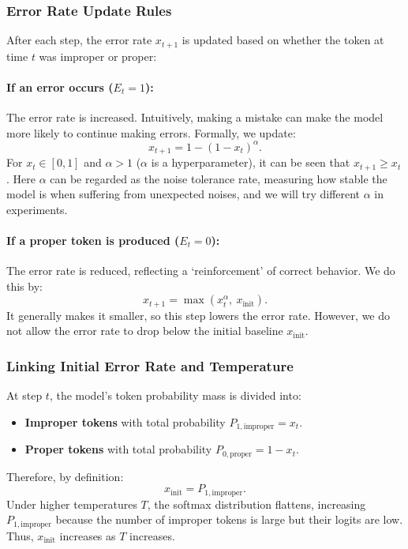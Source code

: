 \subsubsection{Error Rate Update Rules}
   After each step, the error rate \(x_{t+1}\) is updated based on whether the token at time \(t\) was improper or proper:

   \paragraph{If an error occurs (\(E_t = 1\)):}
   The error rate is increased. Intuitively, making a mistake can make the model more likely to continue making errors. Formally, we update:
   \[
   x_{t+1} = 1 - (1 - x_t)^\alpha.
   \]
   For \(x_t \in [0,1]\) and $\alpha > 1$ ($\alpha$ is a hyperparameter), it can be seen that \(x_{t+1} \ge x_t\). Here $\alpha$ can be regarded as the noise tolerance rate, measuring how stable the model is when suffering from unexpected noises, and we will try different $\alpha$ in experiments.

   \paragraph{If a proper token is produced (\(E_t = 0\)):}
   The error rate is reduced, reflecting a `reinforcement' of correct behavior. We do this by:
   \[
   x_{t+1} = \max(x_t^\alpha,\ x_{\text{init}}).
   \]
   It generally makes it smaller, so this step lowers the error rate. However, we do not allow the error rate to drop below the initial baseline \(x_{\text{init}}\).

\subsubsection{Linking Initial Error Rate and Temperature}
\label{sec: temp_to_init}
   At step $t$, the model’s token probability mass is divided into:
   \begin{itemize}
       \item \textbf{Improper tokens} with total probability \(P_{1, \text{improper}} = x_t\).
       \item \textbf{Proper tokens} with total probability \(P_{0, \text{proper}} = 1 - x_t\).
   \end{itemize}
Therefore, by definition:
   \[
   x_{\text{init}} = P_{1, \text{improper}}.
   \]
Under higher temperatures \(T\), the softmax distribution flattens, increasing \(P_{1,\text{improper}}\) because the number of improper tokens is large but their logits are low. Thus, $x_\text{init}$ increases as \(T\) increases.


